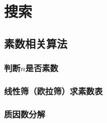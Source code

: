 
\chapter{搜索}
\label{searching}



\section{素数相关算法}

\subsection{判断$𝑛$是否素数}



\subsection{线性筛（欧拉筛）求素数表}


\subsection{质因数分解}





\endinput %
